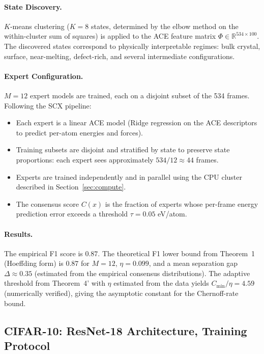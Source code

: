 \documentclass[article]{amsart}
\theoremstyle{definition}
\begin{document}
\paragraph{State Discovery.}
$K$-means clustering ($K = 8$ states, determined by the elbow method on the within-cluster sum of squares) is applied to the ACE feature matrix $\Phi \in \mathbb{R}^{534 \times 100}$. The discovered states correspond to physically interpretable regimes: bulk crystal, surface, near-melting, defect-rich, and several intermediate configurations.

\paragraph{Expert Configuration.}
$M = 12$ expert models are trained, each on a disjoint subset of the 534 frames. Following the SCX pipeline:
\begin{itemize}
    \item Each expert is a linear ACE model (Ridge regression on the ACE descriptors to predict per-atom energies and forces).
    \item Training subsets are disjoint and stratified by state to preserve state proportions: each expert sees approximately $534 / 12 \approx 44$ frames.
    \item Experts are trained independently and in parallel using the CPU cluster described in Section~\ref{sec:compute}.
    \item The consensus score $C(x)$ is the fraction of experts whose per-frame energy prediction error exceeds a threshold $\tau = 0.05$ eV/atom.
\end{itemize}

\paragraph{Results.}
The empirical F1 score is $0.87$. The theoretical F1 lower bound from Theorem~1 (Hoeffding form) is $0.87$ for $M=12$, $\eta=0.099$, and a mean separation gap $\Delta \approx 0.35$ (estimated from the empirical consensus distributions). The adaptive threshold from Theorem~4' with $\eta$ estimated from the data yields $C_{\min}/\eta = 4.59$ (numerically verified), giving the asymptotic constant for the Chernoff-rate bound.

\subsection{CIFAR-10: ResNet-18 Architecture, Training Protocol}
\end{document}
